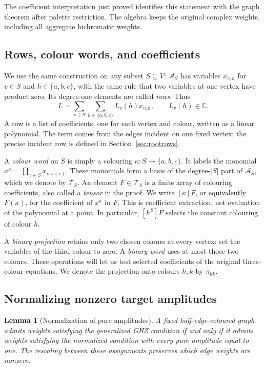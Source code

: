 \documentclass[11pt]{article}
\newtheorem{lemma}[theorem]{Lemma}
\theoremstyle{definition}
\theoremstyle{plain}
\numberwithin{equation}{section}
\begin{document}
The coefficient interpretation just proved identifies this statement with
the graph theorem after palette restriction. The algebra keeps the original
complex weights, including all aggregate bichromatic weights.

\subsection{Rows, colour words, and coefficients}\label{sec:rows}

We use the same construction on any subset \(S\subseteq V\):
\(\mathcal A_S\) has variables \(x_{v,h}\) for \(v\in S\) and
\(h\in\{a,b,c\}\), with the same rule that two variables at one vertex
have product zero. Its degree-one elements are called \emph{rows}. Thus
\[
 L=\sum_{v\in S}\sum_{h\in\{a,b,c\}}L_v(h)x_{v,h},
 \qquad L_v(h)\in\mathbb C.
\]
A row is a list of coefficients, one for each vertex and colour, written as
a linear polynomial. The term comes from the edges incident on one fixed
vertex; the precise incident row is defined in Section~\ref{sec:rootrows}.

A \emph{colour word} on \(S\) is simply a colouring
\(\kappa:S\to\{a,b,c\}\). It labels the monomial
\(x^\kappa=\prod_{v\in S}x_{v,\kappa(v)}\). These monomials form a basis
of the degree-\(|S|\) part of \(\mathcal A_S\), which we denote by
\(\mathcal T_S\). An element \(F\in\mathcal T_S\) is a finite array of
colouring coefficients, also called a \emph{tensor} in the proof. We write
\([\kappa]F\), or equivalently \(F(\kappa)\), for the coefficient of
\(x^\kappa\) in \(F\). This is coefficient extraction, not evaluation of
the polynomial at a point. In particular, \([h^S]F\) selects the constant
colouring of colour \(h\).

A \emph{binary projection} retains only two chosen colours at every vertex:
set the variables of the third colour to zero. A \emph{binary word} uses at
most those two colours. These operations will let us test selected
coefficients of the original three-colour equations. We denote the projection
onto colours \(h,k\) by \(\pi_{hk}\).

\subsection{Normalizing nonzero target amplitudes}\label{sec:normalization}

\begin{lemma}[Normalization of pure amplitudes]\label{lem:normalization}
A fixed half-edge-coloured graph admits weights satisfying the generalized
GHZ condition if and only if it admits weights satisfying the normalized
condition with every pure amplitude equal to one. The rescaling between
these assignments preserves which edge weights are nonzero.
\end{lemma}
\end{document}
